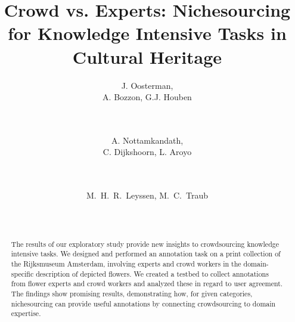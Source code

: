 \documentclass{sig-alternate-2013}
\begin{document}
\title{Crowd vs. Experts: Nichesourcing for Knowledge Intensive Tasks in Cultural Heritage}

\author{
\alignauthor 
J. Oosterman, \\A. Bozzon, G.J. Houben \\
        \\
        \\
\and
\alignauthor A. Nottamkandath, 	\\C. Dijkshoorn, L. Aroyo \\
        \\
        \\
\and  %
\alignauthor  M.~H.~R.~Leyssen, M.~C.~Traub \\
       \\
       \\
       }

\maketitle   
       
\begin{abstract}
The results of our exploratory study provide new insights to crowdsourcing knowledge intensive tasks. 
We designed and performed an annotation task on a print collection of the Rijks\-museum Amsterdam, involving experts and crowd workers in the domain-specific description of depicted flowers. 
We created a testbed to collect annotations from flower experts and crowd workers and analyzed these in regard to user agreement. 
The findings show promising results, demonstrating how, for given categories, nichesourcing can provide useful annotations by connecting crowdsourcing to domain expertise. 
\end{abstract}


\end{document}
